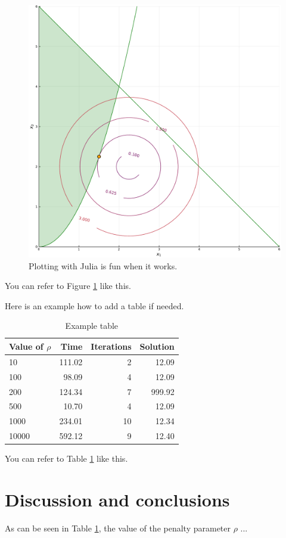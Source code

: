 \documentclass[a4paper]{artikel3}
\begin{document}
\begin{figure}[H]
\centering
\includegraphics[scale=0.50]{Figures/example.pdf}
\caption{Plotting with Julia is fun when it works.}
\label{fig:1}
\end{figure}

You can refer to Figure \ref{fig:1} like this. 


Here is an example how to add a table if needed. 

\begin{table}[H]
\caption{Example table}
\label{tbl:1}
\centering
\begin{tabular}{l r r r}
\toprule
Value of $\rho$    &   Time   &   Iterations  &   Solution\\
\midrule
10    &  111.02  &  2  &  12.09\\
100   &   98.09  &  4  &  12.09\\
200   &  124.34  &  7  &  999.92\\
500   &   10.70  &  4  &  12.09\\
1000  &  234.01  & 10  &  12.34\\
10000 &  592.12  &  9  &  12.40\\
\bottomrule
\end{tabular}
\end{table}

You can refer to Table \ref{tbl:1} like this.

\section{Discussion and conclusions}

As can be seen in Table \ref{tbl:1}, the value of the penalty parameter $\rho$ ...
\end{document}
